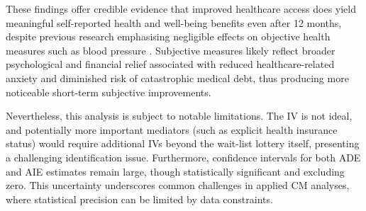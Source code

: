 These findings offer credible evidence that improved healthcare access does yield meaningful self-reported health and well-being benefits even after 12 months, despite previous research emphasising negligible effects on objective health measures such as blood pressure \citep{baicker2013oregon}.
Subjective measures likely reflect broader psychological and financial relief associated with reduced healthcare-related anxiety and diminished risk of catastrophic medical debt, thus producing more noticeable short-term subjective improvements.

Nevertheless, this analysis is subject to notable limitations.
The IV is not ideal, and potentially more important mediators (such as explicit health insurance status) would require additional IVs beyond the wait-list lottery itself, presenting a challenging identification issue.
Furthermore, confidence intervals for both ADE and AIE estimates remain large, though statistically significant and excluding zero.
This uncertainty underscores common challenges in applied CM analyses, where statistical precision can be limited by data constraints.
